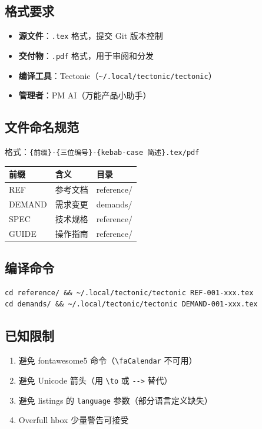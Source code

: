 \documentclass[11pt,a4paper]{article}
\begin{document}
\subsection{格式要求}

\begin{itemize}[nosep]
  \item \textbf{源文件}：\texttt{.tex} 格式，提交 Git 版本控制
  \item \textbf{交付物}：\texttt{.pdf} 格式，用于审阅和分发
  \item \textbf{编译工具}：Tectonic（\texttt{\textasciitilde/.local/tectonic/tectonic}）
  \item \textbf{管理者}：PM AI（万能产品小助手）
\end{itemize}

\subsection{文件命名规范}

格式：\texttt{\{前缀\}-\{三位编号\}-\{kebab-case 简述\}.tex/pdf}

\begin{table}[h]
\centering
\begin{tabular}{lll}
\toprule
\textbf{前缀} & \textbf{含义} & \textbf{目录} \\
\midrule
REF & 参考文档 & reference/ \\
DEMAND & 需求变更 & demands/ \\
SPEC & 技术规格 & reference/ \\
GUIDE & 操作指南 & reference/ \\
\bottomrule
\end{tabular}
\end{table}

\subsection{编译命令}

\begin{lstlisting}
cd reference/ && ~/.local/tectonic/tectonic REF-001-xxx.tex
cd demands/ && ~/.local/tectonic/tectonic DEMAND-001-xxx.tex
\end{lstlisting}

\subsection{已知限制}

\begin{enumerate}[nosep]
  \item 避免 fontawesome5 命令（\texttt{\textbackslash faCalendar} 不可用）
  \item 避免 Unicode 箭头（用 \texttt{\textbackslash to} 或 \texttt{-{}->{}} 替代）
  \item 避免 listings 的 \texttt{language} 参数（部分语言定义缺失）
  \item Overfull hbox 少量警告可接受
\end{enumerate}
\end{document}
